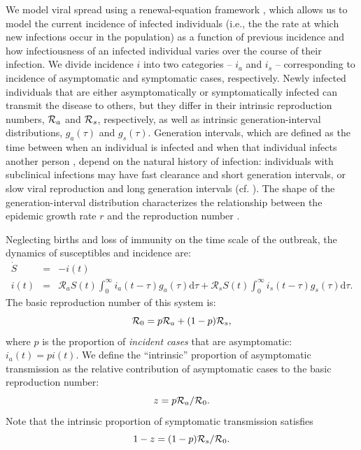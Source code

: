 We model viral spread using a renewal-equation framework \citep{heesterbeek1996concept}, which allows us to model the current incidence of infected individuals (i.e., the the rate at which new infections occur in the population) as a function of previous incidence and how infectiousness of an infected individual varies over the course of their infection.
We divide incidence $i$ into two categories -- $i_a$ and $i_s$ -- corresponding to incidence of asymptomatic and symptomatic cases, respectively.
Newly infected individuals that are either asymptomatically or symptomatically infected can transmit the disease to others, but they differ in their intrinsic reproduction numbers, ${\cal{R}}_a$ and ${\cal{R}}_s$, respectively, as well as intrinsic generation-interval distributions, $g_a(\tau)$ and $g_s(\tau)$.
Generation intervals, which are defined as the time between when an individual is infected and when that individual infects another person \citep{svensson2007note}, depend on the natural history of infection:
individuals with subclinical infections may have fast clearance and short generation intervals, or slow viral reproduction and long generation intervals (cf. \citep{roberts2007model}).
The shape of the generation-interval distribution characterizes the relationship between the epidemic growth rate $r$ and the reproduction number \citep{wallinga2007generation}.

Neglecting births and loss of immunity on the time scale of the outbreak, the dynamics of susceptibles and incidence are:
\begin{eqnarray}
\dot{S}&=&-i(t) \\
i(t)&=&\mathcal R_a S(t) \int_0^\infty i_a(t-\tau) g_a(\tau) \mathrm{d}\tau + \mathcal R_s S(t) \int_0^\infty i_s(t-\tau) g_s(\tau) \mathrm{d}\tau.
\end{eqnarray}
The basic reproduction number of this system is:
\begin{equation}
{\cal{R}}_{0}= p {\cal{R}}_a + (1-p) {\cal{R}}_s,
\end{equation}
where $p$ is the proportion of \emph{incident cases} that are asymptomatic: $i_a(t) = p i(t)$.
We define the ``intrinsic'' proportion of asymptomatic transmission as the relative contribution of asymptomatic cases to the basic reproduction number:
\begin{equation}
z = p {\cal{R}}_a/{\cal{R}}_{0}.
\end{equation}
Note that the intrinsic proportion of symptomatic transmission satisfies
\begin{equation}
1-z = (1-p) {\cal{R}}_s/{\cal{R}}_{0}.
\end{equation}

